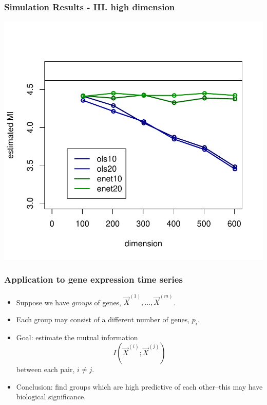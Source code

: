 \documentclass{beamer}
\begin{document}
\begin{frame}
\frametitle{Simulation Results - III. high dimension}
\begin{center}
\includegraphics[scale = 0.65]{../idloss/sim2a_fig3.pdf}
\end{center}
\end{frame}



\begin{frame}
\frametitle{Application to gene expression time series}
\begin{itemize}
\item Suppose we have \emph{groups} of genes, $\vec{X}^{(1)},\hdots, \vec{X}^{(m)}$.
\item Each group may consist of a different number of genes, $p_i$.
\item Goal: estimate the mutual information
\[
I(\vec{X}^{(i)}; \vec{X}^{(j)})
\]
between each pair, $i \neq j$.
\item Conclusion: find groups which are high predictive of each other--this may have biological significance.
\end{itemize}
\end{frame}
\end{document}
